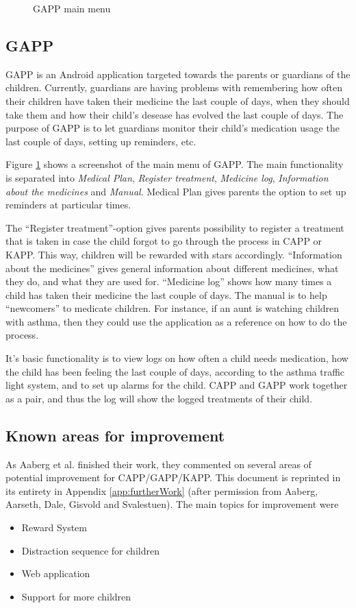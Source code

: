 \begin{figure}
\begin{minipage}[b]{0.4\linewidth}
		\caption{GAPP main menu}
		\label{fig:gapp-main-menu1}
	\end{minipage}
\end{figure}


\subsection{GAPP}
GAPP is an Android application targeted towards the parents or guardians of the children. 
Currently, guardians are having problems with remembering how often their children have taken their medicine the last couple of days, when they should take them and how their child's desease has evolved the last couple of days. The purpose of GAPP is to let guardians monitor their child's medication usage the last couple of days, setting up reminders, etc.

Figure \ref{fig:gapp-main-menu1} shows a screenshot of the main menu of GAPP. The main functionality is separated into 
\emph{Medical Plan}, \emph{Register treatment}, \emph{Medicine log}, \emph{Information about the medicines} and \emph{Manual}. 
Medical Plan gives parents the option to set up reminders at particular times. 

The ``Register treatment''-option gives parents possibility to register a treatment that is taken in case the child forgot to go through the process in CAPP or KAPP. This way, children will be rewarded with stars accordingly. 
``Information about the medicines'' gives general information about different medicines, what they do, and what they are used for.  
``Medicine log'' shows how many times a child has taken their medicine the last couple of days.
The manual is to help ``newcomers'' to medicate children. For instance, if an aunt is watching children with asthma, then they could use the application as a reference on how to do the process. 
        
        
It's basic functionality is to view logs on how often a child needs medication, how the child has been feeling the last couple of days, according to the asthma traffic light system, and to set up alarms for the child. 
CAPP and GAPP work together as a pair, and thus the log will show the logged treatments of their child. 


\subsection{Known areas for improvement}
\label{sec:improvements}
As Aaberg et al. finished their work, they commented on several areas of potential improvement for CAPP/GAPP/KAPP. This document is reprinted in its entirety in Appendix \ref{app:furtherWork} (after permission from Aaberg, Aarseth, Dale, Gisvold and Svalestuen). The main topics for improvement were
\begin{itemize}
\item{Reward System}
\item{Distraction sequence for children}
\item{Web application}
\item{Support for more children}
\end{itemize}

